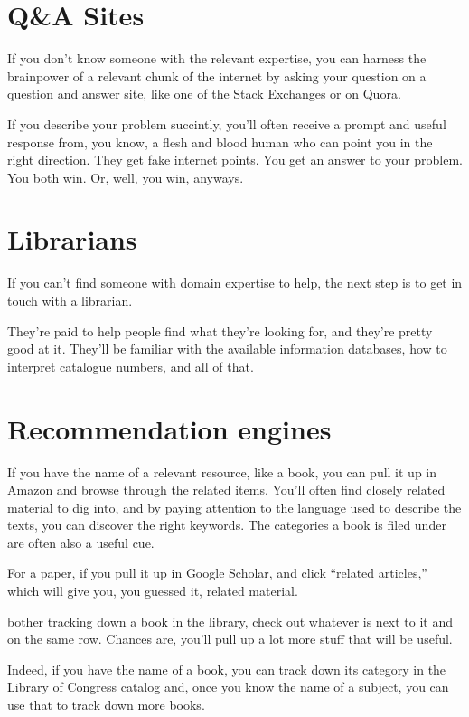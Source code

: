 \section{Q\&A Sites}

If you don't know someone with the relevant expertise, you can harness
the brainpower of a relevant chunk of the internet by asking your question on a
question and answer site, like one of the Stack Exchanges or on Quora.

If you describe your problem succintly, you'll often receive a prompt and useful
response from, you know, a flesh and blood human who can point you in the right
direction. They get fake internet points. You get an answer to your problem. You
both win. Or, well, you win, anyways.

\section{Librarians}

If you can't find someone with domain expertise to help, the next step is to get
in touch with a librarian.

They're paid to help people find what they're looking for, and they're pretty
good at it. They'll be familiar with the available information databases, how to
interpret catalogue numbers, and all of that.

\section{Recommendation engines}

If you have the name of a relevant resource, like a book, you can pull it up in
Amazon and browse through the related items. You'll often find closely related
material to dig into, and by paying attention to the language used to describe
the texts, you can discover the right keywords. The categories a book is filed
under are often also a useful cue.

For a paper, if you pull it up in Google Scholar, and click ``related
articles,'' which will give you, you guessed it, related material.

 bother tracking down a book in the library, check out whatever
is next to it and on the same row. Chances are, you'll pull up a lot more stuff
that will be useful.

Indeed, if you have the name of a book, you can track down its category in the
Library of Congress catalog and, once you know the name of a subject, you can use that
to track down more books.

